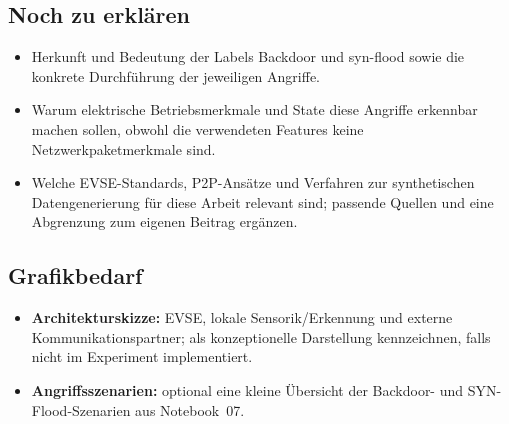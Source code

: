 \subsection{Noch zu erklären}
\begin{itemize}
  \item Herkunft und Bedeutung der Labels Backdoor und syn-flood sowie die
        konkrete Durchführung der jeweiligen Angriffe.
  \item Warum elektrische Betriebsmerkmale und State diese Angriffe
        erkennbar machen sollen, obwohl die verwendeten Features keine
        Netzwerkpaketmerkmale sind.
  \item Welche EVSE-Standards, P2P-Ansätze und Verfahren zur synthetischen
        Datengenerierung für diese Arbeit relevant sind; passende Quellen
        und eine Abgrenzung zum eigenen Beitrag ergänzen.
\end{itemize}

\subsection{Grafikbedarf}
\begin{itemize}
  \item \textbf{Architekturskizze:} EVSE, lokale Sensorik/Erkennung und
        externe Kommunikationspartner; als konzeptionelle Darstellung
        kennzeichnen, falls nicht im Experiment implementiert.
  \item \textbf{Angriffsszenarien:} optional eine kleine Übersicht der
        Backdoor- und SYN-Flood-Szenarien aus Notebook~07.
\end{itemize}
